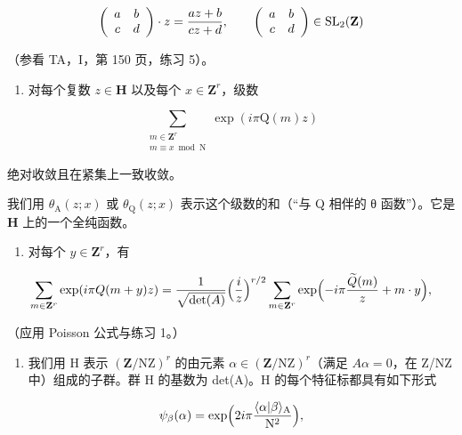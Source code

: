 \[
\left( \begin{array}{c c} a & b \\ c & d \end{array} \right) \cdot z = \frac {a z + b}{c z + d}, \qquad \left( \begin{array}{c c} a & b \\ c & d \end{array} \right) \in \mathrm{SL} _ {2} (\mathbf {Z})
\]

  （参看 TA，I，第 150 页，练习 5）。

\begin{enumerate}
\def\labelenumi{\alph{enumi})}
\setcounter{enumi}{1}
\tightlist
\item
  对每个复数 \(z \in \mathbf{H}\) 以及每个 \(x \in \mathbf{Z}^r\)，级数
\end{enumerate}

\[
\sum_{\substack{m\in \mathbf{Z}^{r}\\ m\equiv x\bmod \mathrm{N}}}\exp (i\pi \mathrm{Q}(m)z)
\]

绝对收敛且在紧集上一致收敛。

我们用 \(\theta_{\mathrm{A}}(z;x)\) 或 \(\theta_{\mathrm{Q}}(z;x)\) 表示这个级数的和（“与 Q 相伴的 θ 函数”）。它是 \(\mathbf{H}\) 上的一个全纯函数。

\begin{enumerate}
\def\labelenumi{\alph{enumi})}
\setcounter{enumi}{2}
\tightlist
\item
  对每个 \(y \in \mathbf{Z}^r\)，有
\end{enumerate}

\[
\sum_ {m \in {\bf Z} ^ {r}} \exp (i \pi Q (m + y) z) = \frac {1}{\sqrt {\det (A)}} \Bigl (\frac {i}{z} \Bigr) ^ {r / 2} \sum_ {m \in {\bf Z} ^ {r}} \exp \Bigl (- i \pi \frac {\widetilde {Q} (m)}{z} + m \cdot y \Bigr),
\]

（应用 Poisson 公式与练习 1。）

\begin{enumerate}
\def\labelenumi{\alph{enumi})}
\setcounter{enumi}{3}
\tightlist
\item
  我们用 H 表示 \((\mathbf{Z}/\mathrm{NZ})^{r}\) 的由元素 \(\alpha\in(\mathbf{Z}/\mathrm{NZ})^{r}\)（满足 \(A\alpha=0\)，在 Z/NZ 中）组成的子群。群 H 的基数为 det(A)。H 的每个特征标都具有如下形式
\end{enumerate}

\[
\psi_ {\beta} (\alpha) = \exp \Bigl (2 i \pi \frac {\langle \alpha | \beta \rangle_ {\mathrm{A}}}{\mathrm{N} ^ {2}} \Bigr),
\]


